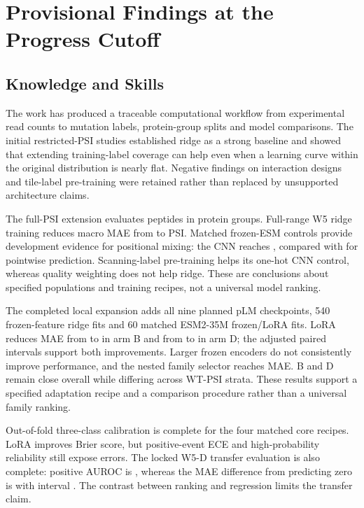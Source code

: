 \label{chap:conclusion}
\ThesisFlatNumbering

\section{Provisional Findings at the Progress Cutoff}
\subsection{Knowledge and Skills}
The work has produced a traceable computational workflow from experimental read counts to mutation
labels, protein-group splits and model comparisons. The initial restricted-PSI studies established
ridge as a strong baseline and showed that extending training-label coverage can help even when a
learning curve within the original distribution is nearly flat. Negative findings on interaction
designs and tile-label pre-training were retained rather than replaced by unsupported architecture claims.

The full-PSI extension evaluates \nVthreeNPeptides{} peptides in \nVthreeNGroups{} protein groups.
Full-range W5 ridge training reduces macro MAE from \nVthreeRidgeB{} to \nVthreeRidgeD{} PSI.
Matched frozen-ESM controls provide development evidence for positional mixing: the CNN reaches
\nVthreeCnnD{}, compared with \nVthreePointwiseD{} for pointwise prediction. Scanning-label
pre-training helps its one-hot CNN control, whereas quality weighting does not help ridge.
These are conclusions about specified populations and training recipes, not a universal model ranking.

The completed local expansion adds all nine planned pLM checkpoints, 540 frozen-feature ridge fits
and 60 matched ESM2-35M frozen/LoRA fits. LoRA reduces MAE from \nCampaignFrozenB{} to
\nCampaignLoraB{} in arm B and from \nCampaignFrozenD{} to \nCampaignLoraD{} in arm D;
the adjusted paired intervals support both improvements. Larger frozen encoders do not consistently
improve performance, and the nested family selector reaches \nCampaignNested{} MAE. B and D
remain close overall while differing across WT-PSI strata. These results support a specified adaptation
recipe and a comparison procedure rather than a universal family ranking.

Out-of-fold three-class calibration is complete for the four matched core recipes. LoRA improves
Brier score, but positive-event ECE and high-probability reliability still expose errors. The locked
W5-D transfer evaluation is also complete: positive AUROC is \nCampaignTAuc{}, whereas the MAE
difference from predicting zero is \nCampaignTDelta{} with interval \nCampaignTCI{}.
The contrast between ranking and regression limits the transfer claim.

